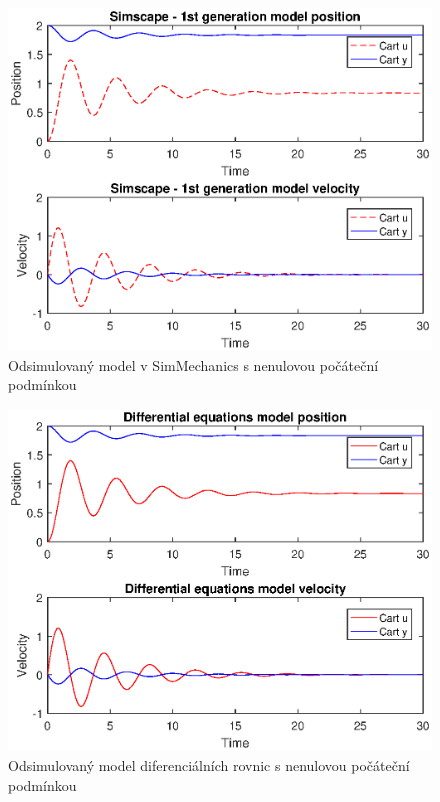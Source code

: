 \begin{figure}[htbp]
	\centering
	\includegraphics[scale=0.7]{graphs/simscape1.eps}
	\caption{Odsimulovaný model v SimMechanics s nenulovou počáteční podmínkou}
\end{figure}
\FloatBarrier

\begin{figure}[htbp]
	\centering
	\includegraphics[scale=0.7]{graphs/equations.eps}
	\caption{Odsimulovaný model diferenciálních rovnic s nenulovou počáteční podmínkou}
\end{figure}
\FloatBarrier

